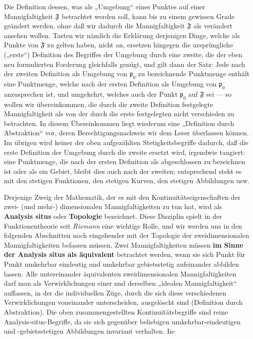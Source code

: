 \documentclass{article}
\begin{document}
Die Definition dessen, was als „Umgebung“ eines Punktes auf einer Mannigfaltigkeit $\mathfrak{F}$ betrachtet werden soll, kann bis zu einem gewissen Grade geändert werden, ohne daß wir dadurch die Mannigfaltigkeit $\mathfrak{F}$ als verändert ansehen wollen. Tasten wir nämlich die Erklärung derjenigen Dinge, welche als Punkte von $\mathfrak{F}$ zu gelten haben, nicht an, ersetzen hingegen die ursprüngliche („erste“) Definition des Begriffes der Umgebung durch eine zweite, die der eben neu formulierten Forderung gleichfalls genügt, und gilt dann der Satz: Jede nach der zweiten Definition als Umgebung von $\mathfrak{p}_0$ zu bezeichnende Punktmenge enthält eine Punktmenge, welche nach der ersten Definition als Umgebung von $\mathfrak{p}_0$ anzusprechen ist, und umgekehrt, welches auch der Punkt $\mathfrak{p}_0$ auf $\mathfrak{F}$ sei --- so wollen wir übereinkommen, die durch die zweite Definition festgelegte Mannigfaltigkeit als von der durch die erste festgelegten nicht verschieden zu betrachten. In diesem Übereinkommen liegt wiederum eine „Definition durch Abstraktion“ vor, deren Berechtigungsnachweis wir dem Leser überlassen können. Im übrigen wird keiner der oben aufgezählten Stetigkeitsbegriffe dadurch, daß die erste Definition der Umgebung durch die zweite ersetzt wird, irgendwie tangiert: eine Punktmenge, die nach der ersten Definition als abgeschlossen zu bezeichnen ist oder als ein Gebiet, bleibt dies auch nach der zweiten; entsprechend steht es mit den stetigen Funktionen, den stetigen Kurven, den stetigen Abbildungen usw.

Derjenige Zweig der Mathematik, der es mit den Kontinuitätseigenschaften der zwei- (und mehr-) dimensionalen Mannigfaltigkeiten zu tun hat, wird als \textbf{Analysis situs} oder \textbf{Topologie} bezeichnet. Diese Disziplin spielt in der Funktionentheorie seit \emph{Riemann} eine wichtige Rolle, und wir werden uns in den folgenden Abschnitten noch eingehender mit der Topologie der zweidimensionalen Mannigfaltigkeiten befassen müssen. Zwei Mannigfaltigkeiten müssen \textbf{im Sinne der Analysis situs als äquivalent} betrachtet werden, wenn sie sich Punkt für Punkt umkehrbar eindeutig und umkehrbar gebietsstetig aufeinander abbilden lassen. Alle untereinander äquivalenten zweidimensionalen Mannigfaltigkeiten darf man als Verwirklichungen einer und derselben „idealen Mannigfaltigkeit“ auffassen, in der die individuellen Züge, durch die sich diese verschiedenen Verwirklichungen voneinander unterscheiden, ausgelöscht sind (Definition durch Abstraktion). Die oben zusammengestellten Kontinuitätsbegriffe sind reine Analysis-situs-Begriffe, da sie sich gegenüber beliebigen umkehrbar-eindeutigen und -gebietsstetigen Abbildungen invariant verhalten. In-
\end{document}
